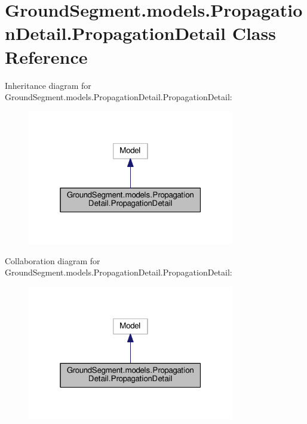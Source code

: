 \hypertarget{class_ground_segment_1_1models_1_1_propagation_detail_1_1_propagation_detail}{}\section{Ground\+Segment.\+models.\+Propagation\+Detail.\+Propagation\+Detail Class Reference}
\label{class_ground_segment_1_1models_1_1_propagation_detail_1_1_propagation_detail}


Inheritance diagram for Ground\+Segment.\+models.\+Propagation\+Detail.\+Propagation\+Detail\+:\nopagebreak
\begin{figure}[H]
\begin{center}
\leavevmode
\includegraphics[width=256pt]{class_ground_segment_1_1models_1_1_propagation_detail_1_1_propagation_detail__inherit__graph}
\end{center}
\end{figure}


Collaboration diagram for Ground\+Segment.\+models.\+Propagation\+Detail.\+Propagation\+Detail\+:\nopagebreak
\begin{figure}[H]
\begin{center}
\leavevmode
\includegraphics[width=256pt]{class_ground_segment_1_1models_1_1_propagation_detail_1_1_propagation_detail__coll__graph}
\end{center}
\end{figure}
